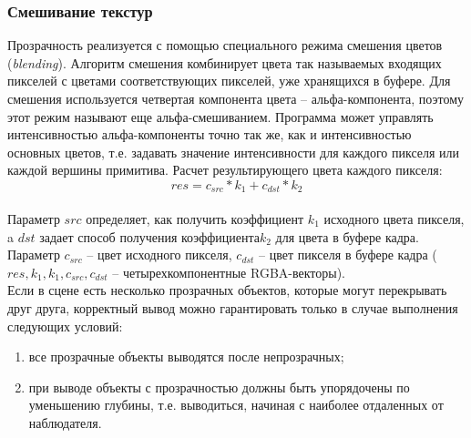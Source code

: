 \documentclass[a4paper, 10pt]{article}
\begin{document}
 	\subsubsection{Смешивание текстур}
 	\hspace*{5mm} Прозрачность реализуется с помощью специального режима смешения цветов (\textit{blending}). Алгоритм смешения комбинирует цвета так называемых входящих пикселей с цветами соответствующих пикселей, уже хранящихся в буфере. Для смешения используется четвертая компонента цвета – альфа-компонента, поэтому этот режим называют еще альфа-смешиванием. Программа может управлять интенсивностью альфа-компоненты точно так же, как и интенсивностью основных цветов, т.е. задавать значение интенсивности для каждого пикселя или каждой вершины примитива. Расчет результирующего цвета каждого пикселя:
 		\begin{equation}
 		res = c_{src}*k_1+c_{dst}*k_2
 	\end{equation}
	\\ \hspace*{5mm} Параметр $src$ определяет, как получить коэффициент $k_1$ исходного цвета пикселя, a $dst$ задает способ получения коэффициента$k_2$ для цвета в буфере кадра. Параметр $c_{src}$ – цвет исходного пикселя, $c_{dst}$ – цвет пикселя в буфере кадра ($res, k_1, k_1, c_{src}, c_{dst}$ – четырехкомпонентные RGBA-векторы).
	\\ \hspace*{5mm}Если в сцене есть несколько прозрачных объектов, которые могут перекрывать друг друга, корректный вывод можно гарантировать только в случае выполнения следующих условий:
	\begin{enumerate}
		\item все прозрачные объекты выводятся после непрозрачных;
		\item при выводе объекты с прозрачностью должны быть упорядочены по уменьшению глубины, т.е. выводиться, начиная с наиболее отдаленных от наблюдателя.
	\end{enumerate}
\end{document}
